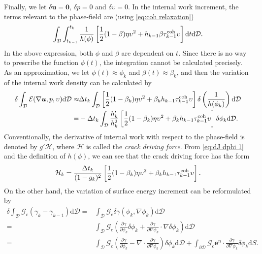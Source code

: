 \documentclass{article}
\begin{document}
Finally, we let $\delta\bm u = \bm 0$, $\delta p = 0$ and $\delta\upsilon = 0$. In the internal work increment, the terms relevant to the phase-field are (using \eqref{eq:coh relaxation})
\begin{equation}\label{eq:I phi}
  \int_{\mathcal D}\int_{t_{k-1}}^{t_k}\frac{1}{h(\phi)}\left[\frac{1}{2}(1-\beta)\eta\upsilon^2 + h_{k-1}\beta\tau_{k-1}^{\rm coh}\upsilon\right]\mathrm dt\mathrm d\mathcal D.
\end{equation}
In the above expression, both $\phi$ and $\beta$ are dependent on $t$. Since there is no way to prescribe the function $\phi(t)$, the integration cannot be calculated precisely. As an approximation, we let $\phi(t)\approx\phi_k$ and $\beta(t)\approx\beta_k$, and then the variation of the internal work density can be calculated by
\begin{equation}\label{eq:dJ dphi 1}
  \begin{aligned}
    \delta\int_{\mathcal D}\mathcal E(\nabla\bm u,p,\upsilon)\mathrm d\mathcal D
    \approx&\Delta t_k\int_{\mathcal D}\left[\frac{1}{2}(1-\beta_k)\eta\upsilon^2 + \beta_kh_{k-1}\tau_{k-1}^{\rm coh}\upsilon\right]\delta\left(\frac{1}{h(\phi_k)}\right)\mathrm d\mathcal D \\
    =&-\Delta t_k\int_{\mathcal D}\frac{h'_k}{h_k^2}\left[\frac{1}{2}(1-\beta_k)\eta\upsilon^2 + \beta_kh_{k-1}\tau_{k-1}^{\rm coh}\upsilon\right]\delta\phi_k\mathrm d\mathcal D.
  \end{aligned}
\end{equation}
Conventionally, the derivative of internal work with respect to the phase-field is denoted by $g'\mathcal H$, where $\mathcal H$ is called the \textit{crack driving force}. From \eqref{eq:dJ dphi 1} and the definition of $h(\phi)$, we can see that the crack driving force has the form
\begin{equation}\label{eq:H}
  \mathcal H_k = \frac{\Delta t_k}{(1-g_k)^2}\left[\frac{1}{2}(1-\beta_k)\eta\upsilon^2 + \beta_kh_{k-1}\tau_{k-1}^{\rm coh}\upsilon\right].
\end{equation}
On the other hand, the variation of surface energy increment can be reformulated by
\begin{equation}\label{eq:dJ dphi 2}
  \begin{aligned}
    \delta\int_{\mathcal D}\mathcal G_c(\gamma_k - \gamma_{k-1})\mathrm d\mathcal D
    =&\int_{\mathcal D}\mathcal G_c\delta\gamma(\phi_k,\nabla\phi_k)\mathrm d\mathcal D \\
    =&\int_{\mathcal D}\mathcal G_c\left(\frac{\partial\gamma}{\partial\phi_k}\delta\phi_k + \frac{\partial\gamma}{\partial\nabla\phi_k}\cdot\nabla\delta\phi_k\right)\mathrm d\mathcal D \\
    =&\int_{\mathcal D}\mathcal G_c\left(\frac{\partial\gamma}{\partial\phi_k} - \nabla\cdot\frac{\partial\gamma}{\partial\nabla\phi_k}\right)\delta\phi_k\mathrm d\mathcal D + \int_{\partial\mathcal D}\mathcal G_c\bm e^n\cdot\frac{\partial\gamma}{\partial\nabla\phi_k}\delta\phi_k\mathrm dS.
  \end{aligned}
\end{equation}
\end{document}

